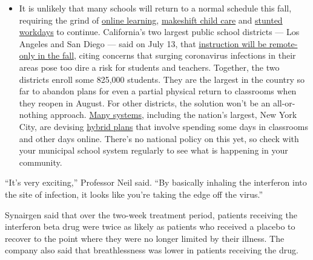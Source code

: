 \begin{itemize}
  \begin{itemize}
  \tightlist
  \item
    It is unlikely that many schools will return to a normal schedule
    this fall, requiring the grind of
    \href{https://www.nytimes.com/2020/06/05/us/coronavirus-education-lost-learning.html?action=click\&pgtype=Article\&state=default\&region=MAIN_CONTENT_3\&context=storylines_faq}{online
    learning},
    \href{https://www.nytimes.com/2020/05/29/us/coronavirus-child-care-centers.html?action=click\&pgtype=Article\&state=default\&region=MAIN_CONTENT_3\&context=storylines_faq}{makeshift
    child care} and
    \href{https://www.nytimes.com/2020/06/03/business/economy/coronavirus-working-women.html?action=click\&pgtype=Article\&state=default\&region=MAIN_CONTENT_3\&context=storylines_faq}{stunted
    workdays} to continue. California's two largest public school
    districts --- Los Angeles and San Diego --- said on July 13, that
    \href{https://www.nytimes.com/2020/07/13/us/lausd-san-diego-school-reopening.html?action=click\&pgtype=Article\&state=default\&region=MAIN_CONTENT_3\&context=storylines_faq}{instruction
    will be remote-only in the fall}, citing concerns that surging
    coronavirus infections in their areas pose too dire a risk for
    students and teachers. Together, the two districts enroll some
    825,000 students. They are the largest in the country so far to
    abandon plans for even a partial physical return to classrooms when
    they reopen in August. For other districts, the solution won't be an
    all-or-nothing approach.
    \href{https://bioethics.jhu.edu/research-and-outreach/projects/eschool-initiative/school-policy-tracker/}{Many
    systems}, including the nation's largest, New York City, are
    devising
    \href{https://www.nytimes.com/2020/06/26/us/coronavirus-schools-reopen-fall.html?action=click\&pgtype=Article\&state=default\&region=MAIN_CONTENT_3\&context=storylines_faq}{hybrid
    plans} that involve spending some days in classrooms and other days
    online. There's no national policy on this yet, so check with your
    municipal school system regularly to see what is happening in your
    community.
  \end{itemize}
\end{itemize}

``It's very exciting,'' Professor Neil said. ``By basically inhaling the
interferon into the site of infection, it looks like you're taking the
edge off the virus.''

Synairgen said that over the two-week treatment period, patients
receiving the interferon beta drug were twice as likely as patients who
received a placebo to recover to the point where they were no longer
limited by their illness. The company also said that breathlessness was
lower in patients receiving the drug.

